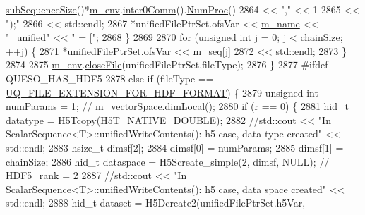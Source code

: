\begin{DoxyCode}
      \hyperlink{class_q_u_e_s_o_1_1_scalar_sequence_a0288ea295eedc216a1617b3286f6f3a0}{subSequenceSize}()*\hyperlink{class_q_u_e_s_o_1_1_scalar_sequence_a71618cd6351b29361b437af68447a4c8}{m\_env}.\hyperlink{class_q_u_e_s_o_1_1_base_environment_a689e4d140c74d495d97eb498714a4b82}{inter0Comm}().\hyperlink{class_q_u_e_s_o_1_1_mpi_comm_aa780721ae0fdeabc5a15e04cb0cad964}{NumProc}()
2864                                         << \textcolor{stringliteral}{","}                                 << 1
2865                                         << \textcolor{stringliteral}{");"}
2866                                         << std::endl;
2867               *unifiedFilePtrSet.ofsVar << \hyperlink{class_q_u_e_s_o_1_1_scalar_sequence_a8568f3ceb7cef2c4e3cf6dbf52d43cdf}{m\_name} << \textcolor{stringliteral}{"\_unified"} << \textcolor{stringliteral}{" = ["};
2868             \}
2869 
2870             \textcolor{keywordflow}{for} (\textcolor{keywordtype}{unsigned} \textcolor{keywordtype}{int} j = 0; j < chainSize; ++j) \{
2871               *unifiedFilePtrSet.ofsVar << \hyperlink{class_q_u_e_s_o_1_1_scalar_sequence_ae616036fd2e62fb69df167814545e893}{m\_seq}[j]
2872                                         << std::endl;
2873             \}
2874 
2875             \hyperlink{class_q_u_e_s_o_1_1_scalar_sequence_a71618cd6351b29361b437af68447a4c8}{m\_env}.\hyperlink{class_q_u_e_s_o_1_1_base_environment_ab712bff194ddd91459d4ea8715c77e8b}{closeFile}(unifiedFilePtrSet,fileType);
2876     \}
2877 \textcolor{preprocessor}{#ifdef QUESO\_HAS\_HDF5}
2878 \textcolor{preprocessor}{}          \textcolor{keywordflow}{else} \textcolor{keywordflow}{if} (fileType == \hyperlink{_defines_8h_a4ebcc075277d031eb97c90b9a45f4493}{UQ\_FILE\_EXTENSION\_FOR\_HDF\_FORMAT}) \{
2879             \textcolor{keywordtype}{unsigned} \textcolor{keywordtype}{int} numParams = 1; \textcolor{comment}{// m\_vectorSpace.dimLocal();}
2880             \textcolor{keywordflow}{if} (r == 0) \{
2881               hid\_t datatype = H5Tcopy(H5T\_NATIVE\_DOUBLE);
2882               \textcolor{comment}{//std::cout << "In ScalarSequence<T>::unifiedWriteContents(): h5 case, data type created" <<
       std::endl;}
2883               hsize\_t dimsf[2];
2884               dimsf[0] = numParams;
2885               dimsf[1] = chainSize;
2886               hid\_t dataspace = H5Screate\_simple(2, dimsf, NULL); \textcolor{comment}{// HDF5\_rank = 2}
2887               \textcolor{comment}{//std::cout << "In ScalarSequence<T>::unifiedWriteContents(): h5 case, data space created" <<
       std::endl;}
2888               hid\_t dataset = H5Dcreate2(unifiedFilePtrSet.h5Var,

\end{DoxyCode}

